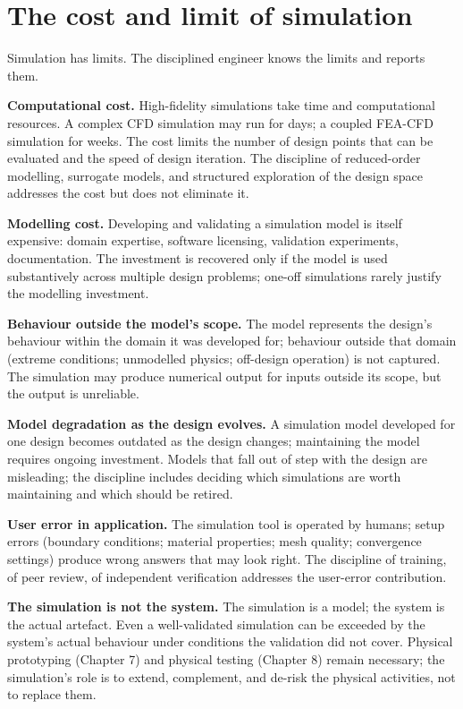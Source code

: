 \section{The cost and limit of simulation}

Simulation has limits. The disciplined engineer knows the limits and reports them.

\textbf{Computational cost.} High-fidelity simulations take time and computational resources. A complex CFD simulation may run for days; a coupled FEA-CFD simulation for weeks. The cost limits the number of design points that can be evaluated and the speed of design iteration. The discipline of reduced-order modelling, surrogate models, and structured exploration of the design space addresses the cost but does not eliminate it.

\textbf{Modelling cost.} Developing and validating a simulation model is itself expensive: domain expertise, software licensing, validation experiments, documentation. The investment is recovered only if the model is used substantively across multiple design problems; one-off simulations rarely justify the modelling investment.

\textbf{Behaviour outside the model's scope.} The model represents the design's behaviour within the domain it was developed for; behaviour outside that domain (extreme conditions; unmodelled physics; off-design operation) is not captured. The simulation may produce numerical output for inputs outside its scope, but the output is unreliable.

\textbf{Model degradation as the design evolves.} A simulation model developed for one design becomes outdated as the design changes; maintaining the model requires ongoing investment. Models that fall out of step with the design are misleading; the discipline includes deciding which simulations are worth maintaining and which should be retired.

\textbf{User error in application.} The simulation tool is operated by humans; setup errors (boundary conditions; material properties; mesh quality; convergence settings) produce wrong answers that may look right. The discipline of training, of peer review, of independent verification addresses the user-error contribution.

\textbf{The simulation is not the system.} The simulation is a model; the system is the actual artefact. Even a well-validated simulation can be exceeded by the system's actual behaviour under conditions the validation did not cover. Physical prototyping (Chapter 7) and physical testing (Chapter 8) remain necessary; the simulation's role is to extend, complement, and de-risk the physical activities, not to replace them.

